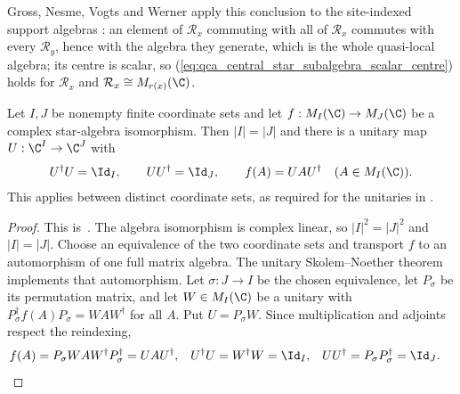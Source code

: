 Gross, Nesme, Vogts and Werner apply this conclusion to the site-indexed
support algebras \cite[lines~1276--1282]{Gross2012IndexTheory}: an element of
$\mathcal R_x$ commuting with all of $\mathcal R_x$ commutes with every
$\mathcal R_y$, hence with the algebra they generate, which is the whole
quasi-local algebra; its centre is scalar, so
(\ref{eq:qca_central_star_subalgebra_scalar_centre}) holds for $\mathcal R_x$
and $\mathcal R_x\cong M_{r(x)}(\C)$.

\begin{lemma}
    \label{lem:qca_full_matrix_spatial_implementer}
    \leanok
    Let $I,J$ be nonempty finite coordinate sets and let
    $f:M_I(\C)\to M_J(\C)$ be a complex star-algebra
    isomorphism. Then $|I|=|J|$ and there is a unitary map
    $U:\C^I\to\C^J$ with
    \begin{align}
        U^\dagger U=\Id_I,\qquad UU^\dagger=\Id_J,\qquad
        f(A)=UAU^\dagger\quad(A\in M_I(\C)).
    \end{align}
    This applies between distinct coordinate sets, as required for the
    unitaries in \cite[equations~\texttt{bruleU} and~\texttt{bruleV},
        lines~980--1001]{SchumacherWerner2004QCA}.
\end{lemma}
\begin{proof}
    \leanok
    This is~\cite[``A full-matrix star-isomorphism has a unitary
        implementer'']{QICLean2026Blueprint}.
    The algebra isomorphism is complex linear, so $|I|^2=|J|^2$ and
    $|I|=|J|$. Choose an equivalence of the two coordinate sets and
    transport $f$ to an automorphism of one full matrix algebra.
    The unitary Skolem--Noether theorem implements that automorphism.
    Let $\sigma:J\to I$ be the chosen equivalence, let $P_\sigma$ be its
    permutation matrix, and let $W\in M_I(\C)$ be a unitary with
    $P_\sigma^\dagger f(A)P_\sigma=WAW^\dagger$ for all $A$. Put
    $U=P_\sigma W$. Since multiplication and adjoints respect the
    reindexing,
    \begin{align}
        f(A)
         & =P_\sigma WAW^\dagger P_\sigma^\dagger
        =UAU^\dagger,
         &
        U^\dagger U
         & =W^\dagger W=\Id_I,
         &
        UU^\dagger
         & =P_\sigma P_\sigma^\dagger=\Id_J.
        \label{eq:qca_full_matrix_spatial_transport}
    \end{align}
\end{proof}
